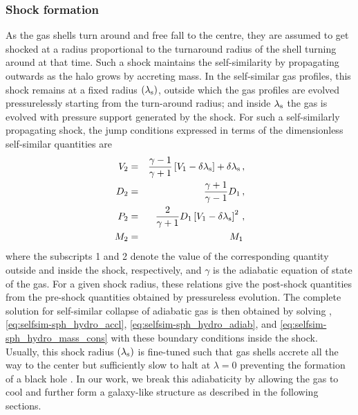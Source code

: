 \subsubsection{Shock formation}%
As the gas shells turn around and free fall to the centre, they are assumed to get shocked at a radius proportional to the turnaround radius of the shell turning around at that time. Such a shock maintains the self-similarity by 
propagating outwards as the halo grows by accreting mass.
In the self-similar gas profiles, this shock remains at a fixed radius $(\lambda_{\rm s})$, outside which the gas profiles are evolved pressurelessly starting from the turn-around radius;
and inside $\lambda_{\rm s}$ the gas is evolved with pressure support generated by the shock.
For such a self-similarly propagating shock, the jump conditions \cite{1985Bertschinger} expressed in terms of the dimensionless self-similar quantities are 
\begin{eqnarray}
\label{eq:shock_jump_selfsim}
V_2 &=& \frac{\gamma -1}{\gamma +1} \left[ V_1-\delta \lambda _{\rm s} \right] + \delta \lambda _{\rm s} \,,\nonumber\\
D_2 &=& \frac{\gamma +1}{\gamma -1} D_1 \,,\nonumber\\
P_2 &=& \frac{2}{\gamma +1} D_1 \left[ V_1-\delta \lambda _{\rm s} \right]^2 \,,\nonumber\\
M_2 &=& M_1 \,
\end{eqnarray}
where the subscripts 1 and 2 denote the value of the corresponding quantity outside and inside the shock, respectively, and $\gamma$ is the adiabatic equation of state of the gas. %
For a given shock radius, these relations give the post-shock quantities from the pre-shock quantities obtained by pressureless evolution. 
The complete solution for self-similar collapse of adiabatic gas is then obtained by solving , \eqref{eq:selfsim-sph_hydro_accl}, \eqref{eq:selfsim-sph_hydro_adiab}, and \eqref{eq:selfsim-sph_hydro_mass_cons} with these boundary conditions inside the shock.
Usually, this shock radius $(\lambda_{\rm s})$ is fine-tuned such that gas shells accrete all the way to the center but sufficiently slow to halt at $\lambda=0$ preventing the formation of a black hole \cite{1985Bertschinger}. In our work, we break this adiabaticity by allowing the gas to cool and further form a galaxy-like structure as described in the following sections.









